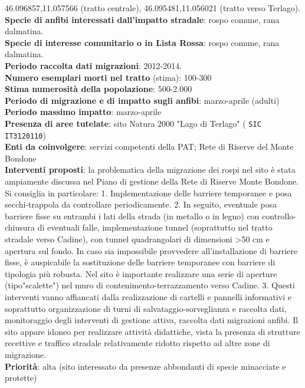 \documentclass[11pt,a4paper,twoside]{memoir}
\begin{document}
46.096857,11.057566 (tratto centrale), 46.095481,11.056021 (tratto verso Terlago). \\
\textbf{Specie di anfibi interessati dall’impatto stradale}: rospo comune, rana dalmatina. \\
\textbf{Specie di interesse comunitario o in Lista Rossa}: rospo comune, rana dalmatina.  \\
\textbf{Periodo raccolta dati migrazioni}: 2012-2014. \\
\textbf{Numero esemplari morti nel tratto} (stima): 100-300  \\ 
\textbf{Stima numerosità della popolazione}: 500-2.000 \\
\textbf{Periodo di migrazione e di impatto sugli anfibi}: marzo-aprile (adulti) \\
\textbf{Periodo massimo impatto}: marzo-aprile \\
\textbf{Presenza di aree tutelate}: sito Natura 2000 "Lago di Terlago" ( \texttt{SIC IT3120110}) \\
\textbf{Enti da coinvolgere}: servizi competenti della PAT; Rete di Riserve del Monte Bondone \\
\textbf{Interventi proposti}:  la problematica della migrazione dei rospi nel sito è stata ampiamente discussa nel Piano di gestione della Rete di Riserve Monte Bondone. Si consiglia in particolare: 1. Implementazione delle barriere temporanee e posa secchi-trappola da controllare periodicamente. 2. In seguito, eventuale posa barriere fisse su entrambi i lati della strada (in metallo o in legno) con controllo-chiusura di eventuali falle, implementazione tunnel (soprattutto nel tratto stradale verso Cadine), con tunnel quadrangolari di dimensioni >50 cm e apertura sul fondo. In caso sia impossibile provvedere all'installazione di barriere fisse, è auspicabile la sostituzione delle barriere temporanee con barriere di tipologia più robusta. Nel sito è importante realizzare una serie di aperture (tipo"scalette") nel muro di contenimento-terrazzamento verso Cadine. 3. Questi interventi vanno affiancati dalla realizzazione di cartelli e pannelli informativi e soprattutto organizzazione di turni di salvataggio-sorveglianza e raccolta dati, monitoraggio degli interventi di gestione attiva, raccolta dati migrazioni anfibi. Il sito appare idoneo per realizzare attività didattiche, vista la presenza di strutture recettive e traffico stradale relativamente ridotto rispetto ad altre zone di migrazione. \\
\textbf{Priorità}: alta (sito interessato da presenze abbondanti di specie minacciate e protette) \\
\end{document}
